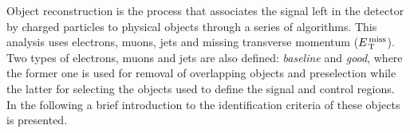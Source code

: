 Object reconstruction is the process that associates the signal left in the
detector by charged particles to physical objects through a series of
algorithms. This analysis uses electrons, muons, jets and missing transverse
momentum ($E_\mathrm{\, T}^\mathrm{\, miss}$). Two types of electrons, muons and jets are also defined:
\emph{baseline} and \emph{good}, where the former one is used for removal of
overlapping objects and preselection while the latter for selecting the objects
used to define the signal and control regions. In the following a brief
introduction to the identification criteria of these objects is presented.
